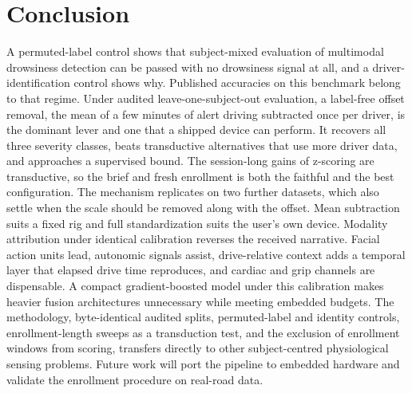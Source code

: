 \documentclass[journal]{IEEEtran}
\begin{document}
\section{Conclusion}
A permuted-label control shows that subject-mixed evaluation of multimodal
drowsiness detection can be passed with no drowsiness signal at all, and a
driver-identification control shows why. Published accuracies on this
benchmark belong to that regime. Under audited leave-one-subject-out
evaluation, a label-free offset removal, the mean of a few minutes of alert
driving subtracted once per driver, is the dominant lever and one that a
shipped device can perform. It recovers all three severity classes, beats
transductive alternatives that use more driver data, and approaches a
supervised bound. The session-long gains of z-scoring are transductive, so
the brief and fresh enrollment is both the faithful and the best
configuration. The mechanism replicates on two further datasets, which also
settle when the scale should be removed along with the offset. Mean
subtraction suits a fixed rig and full standardization suits the user's own
device. Modality attribution under identical calibration reverses the
received narrative. Facial action units lead, autonomic signals assist,
drive-relative context adds a temporal layer that elapsed drive time
reproduces, and cardiac and grip channels are dispensable. A compact gradient-boosted model under this calibration makes
heavier fusion architectures unnecessary while meeting embedded budgets. The
methodology, byte-identical audited splits, permuted-label and identity
controls, enrollment-length sweeps as a transduction test, and the exclusion
of enrollment windows from scoring, transfers directly to other
subject-centred physiological sensing problems. \balance Future work will port the
pipeline to embedded hardware and validate the enrollment procedure on
real-road data.
\end{document}
